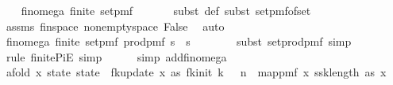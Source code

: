 \begin{isabellebody}
\ \ \isamarkupfalse%
\ fin{\isacharunderscore}{\kern0pt}omega{\isacharcolon}{\kern0pt}\ {\isachardoublequoteopen}finite\ {\isacharparenleft}{\kern0pt}set{\isacharunderscore}{\kern0pt}pmf\ {\isasymOmega}{\isacharparenright}{\kern0pt}{\isachardoublequoteclose}\isanewline
\ \ \ \ \isamarkupfalse%
\ {\isacharparenleft}{\kern0pt}subst\ {\isasymOmega}{\isacharunderscore}{\kern0pt}def{\isacharcomma}{\kern0pt}\ subst\ set{\isacharunderscore}{\kern0pt}pmf{\isacharunderscore}{\kern0pt}of{\isacharunderscore}{\kern0pt}set{\isacharparenright}{\kern0pt}\isanewline
\ \ \ \ \isamarkupfalse%
\ assms{\isacharparenleft}{\kern0pt}{}{\isacharparenright}{\kern0pt}\ fin{\isacharunderscore}{\kern0pt}space\ non{\isacharunderscore}{\kern0pt}empty{\isacharunderscore}{\kern0pt}space\ False\ \isamarkupfalse%
\ auto\isanewline
\ \ \isamarkupfalse%
\ fin{\isacharunderscore}{\kern0pt}omega{\isacharunderscore}{\kern0pt}{}{\isacharcolon}{\kern0pt}\ {\isachardoublequoteopen}finite\ {\isacharparenleft}{\kern0pt}set{\isacharunderscore}{\kern0pt}pmf\ {\isacharparenleft}{\kern0pt}{\isacharparenleft}{\kern0pt}prod{\isacharunderscore}{\kern0pt}pmf\ {\isacharparenleft}{\kern0pt}{\isacharbraceleft}{\kern0pt}{}{\isachardot}{\kern0pt}{\isachardot}{\kern0pt}{\isacharless}{\kern0pt}s\ {\isasymtimes}\ {\isacharbraceleft}{\kern0pt}{}{\isachardot}{\kern0pt}{\isachardot}{\kern0pt}{\isacharless}{\kern0pt}s\ {\isacharparenleft}{\kern0pt}{\isasymlambda}{\isacharunderscore}{\kern0pt}{\isachardot}{\kern0pt}\ {\isasymOmega}{\isacharparenright}{\kern0pt}{\isacharparenright}{\kern0pt}{\isacharparenright}{\kern0pt}{\isacharparenright}{\kern0pt}{\isachardoublequoteclose}\isanewline
\ \ \ \ \isamarkupfalse%
\ {\isacharparenleft}{\kern0pt}subst\ set{\isacharunderscore}{\kern0pt}prod{\isacharunderscore}{\kern0pt}pmf{\isacharcomma}{\kern0pt}\ simp{\isacharparenright}{\kern0pt}\isanewline
\ \ \ \ \isamarkupfalse%
\ {\isacharparenleft}{\kern0pt}rule\ finite{\isacharunderscore}{\kern0pt}PiE{\isacharcomma}{\kern0pt}\ simp{\isacharparenright}{\kern0pt}\isanewline
\ \ \ \ \isamarkupfalse%
\ {\isacharparenleft}{\kern0pt}simp\ add{\isacharcolon}{\kern0pt}fin{\isacharunderscore}{\kern0pt}omega{\isacharparenright}{\kern0pt}\isanewline
\isanewline
\ \ \isamarkupfalse%
\ a{\isacharcolon}{\kern0pt}{\isachardoublequoteopen}fold\ {\isacharparenleft}{\kern0pt}{\isasymlambda}x\ state{\isachardot}{\kern0pt}\ state\ {\isasymbind}\ fk{\isacharunderscore}{\kern0pt}update\ x{\isacharparenright}{\kern0pt}\ as\ {\isacharparenleft}{\kern0pt}fk{\isacharunderscore}{\kern0pt}init\ k\ {\isasymdelta}\ {\isasymepsilon}\ n{\isacharparenright}{\kern0pt}\ {\isacharequal}{\kern0pt}\ map{\isacharunderscore}{\kern0pt}pmf\ {\isacharparenleft}{\kern0pt}{\isasymlambda}x{\isachardot}{\kern0pt}\ {\isacharparenleft}{\kern0pt}ssk{\isacharcomma}{\kern0pt}length\ as{\isacharcomma}{\kern0pt}\ x{\isacharparenright}{\kern0pt}{\isacharparenright}{\kern0pt}\ \isanewline

\end{isabellebody}
